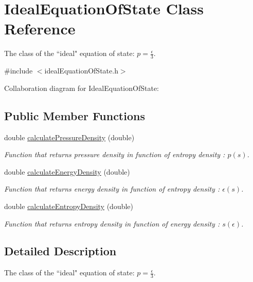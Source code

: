 \hypertarget{classIdealEquationOfState}{}\section{Ideal\+Equation\+Of\+State Class Reference}
\label{classIdealEquationOfState}


The class of the ``ideal" equation of state\+: $p = \frac{\epsilon}{3}$.  




{\ttfamily \#include $<$ideal\+Equation\+Of\+State.\+h$>$}



Collaboration diagram for Ideal\+Equation\+Of\+State\+:
\subsection*{Public Member Functions}
\begin{DoxyCompactItemize}
\item 
double \hyperlink{classIdealEquationOfState_ad3a68929f5709ef5e518b76a8f072f76}{calculate\+Pressure\+Density} (double)
\begin{DoxyCompactList}\small\item\em Function that returns pressure density in function of entropy density \+: $p(s)$. \end{DoxyCompactList}\item 
double \hyperlink{classIdealEquationOfState_a9d0a6954717185ba1c2957650fed544f}{calculate\+Energy\+Density} (double)
\begin{DoxyCompactList}\small\item\em Function that returns energy density in function of entropy density \+: $\epsilon(s)$. \end{DoxyCompactList}\item 
double \hyperlink{classIdealEquationOfState_a211e1d44f5f57c7ba73c3641c0750f65}{calculate\+Entropy\+Density} (double)
\begin{DoxyCompactList}\small\item\em Function that returns entropy density in function of energy density \+: $s(\epsilon)$. \end{DoxyCompactList}\end{DoxyCompactItemize}


\subsection{Detailed Description}
The class of the ``ideal" equation of state\+: $p = \frac{\epsilon}{3}$. 

